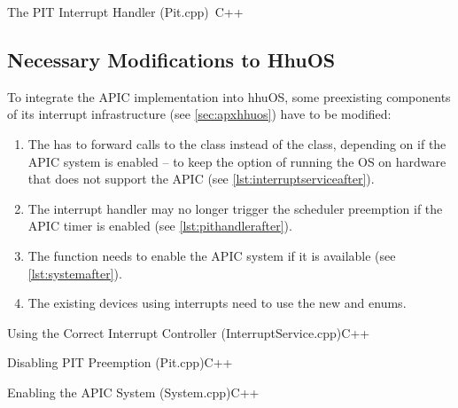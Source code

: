 \begin{codeblock}{The PIT Interrupt Handler (Pit.cpp)~\autocite{hhuos}}{C++}
\end{codeblock}

\clearpage

\subsection{Necessary Modifications to HhuOS}
\label{subsec:hhuosintegration}

To integrate the APIC implementation into hhuOS, some preexisting components of its interrupt infrastructure (see \autoref{sec:apxhhuos}) have to be modified:

\begin{enumerate}
  \item The  has to forward calls to the  class instead of the  class, depending on if the APIC system is enabled -- to keep the option of running the OS on hardware that does not support the APIC (see \autoref{lst:interruptserviceafter}).
  \item The  interrupt handler may no longer trigger the scheduler preemption if the APIC timer is enabled (see \autoref{lst:pithandlerafter}).
  \item The  function needs to enable the APIC system if it is available (see \autoref{lst:systemafter}).
  \item The existing devices using interrupts need to use the new  and  enums.
\end{enumerate}

\begin{codeblock}[label=lst:interruptserviceafter]{Using the Correct Interrupt Controller (InterruptService.cpp)}{C++}
\end{codeblock}

\begin{codeblock}[label=lst:pithandlerafter]{Disabling PIT Preemption (Pit.cpp)}{C++}
\end{codeblock}

\begin{codeblock}[label=lst:systemafter]{Enabling the APIC System (System.cpp)}{C++}
\end{codeblock}

